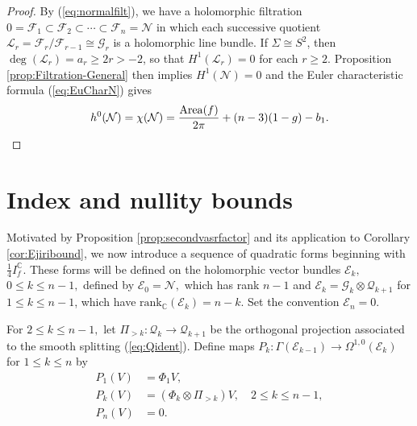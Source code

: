 \documentclass[11pt]{article}
\theoremstyle{definition}
\newcommand{\C}{\mathbb{C}}
\numberwithin{equation}{section}
\begin{document}
\begin{proof}
	By (\ref{eq:normalfilt}), we have a holomorphic filtration $0 = \mathcal{F}_1 \subset \mathcal{F}_2 \subset \cdots \subset \mathcal{F}_n = \mathcal{N}$ in which each successive quotient $\mathcal{L}_r = \mathcal{F}_r/\mathcal{F}_{r-1} \cong \mathcal{G}_r$ is a holomorphic line bundle. If $\Sigma \cong S^2$, then $\deg(\mathcal{L}_r) = a_r \geq 2r > -2$, so that $H^1(\mathcal{L}_r) = 0$ for each $r \geq 2$. Proposition \ref{prop:Filtration-General} then implies $H^1(\mathcal{N}) = 0$ and the Euler characteristic formula (\ref{eq:EuCharN}) gives
	\begin{equation*}
		h^0(\mathcal{N}) = \chi(\mathcal{N}) = \frac{\operatorname{Area}(f)}{2\pi} + (n-3)(1-g) - b_1. \qedhere
	\end{equation*}
\end{proof}

\section{Index and nullity bounds}\label{sect:bounds}

\indent \indent Motivated by Proposition \ref{prop:secondvasrfactor} and its application to Corollary \ref{cor:Ejiribound}, we now introduce a sequence of quadratic forms beginning with $\tfrac{1}{4} I^{\C}_f.$  These forms will be defined on the holomorphic vector bundles $\mathcal{E}_k,$ $0 \leq k \leq n-1,$ defined by $\mathcal{E}_0 = \mathcal{N},$ which has rank $n-1$ and $\mathcal{E}_k = \mathcal{G}_k \otimes \mathcal{Q}_{k+1}$ for $1 \leq k \leq n-1$, which have $\mathrm{rank}_\C(\mathcal{E}_k) = n - k$. Set the convention $\mathcal{E}_n = 0.$

For $2 \leq k \leq n-1,$ let $\Pi_{>k}: \mathcal{Q}_{k} \to \mathcal{Q}_{k+1}$ be the orthogonal projection associated to the smooth splitting (\ref{eq:Qident}). Define maps $P_k : \Gamma(\mathcal{E}_{k-1}) \to \Omega^{1,0}(\mathcal{E}_{k})$ for $1 \leq k \leq n$ by
\begin{equation*}
	\begin{aligned}
		P_1(V) & = \Phi_1 V,                                              \\
		P_k(V) & = (\Phi_{k} \otimes \Pi_{>k})V, \quad 2 \leq k \leq n-1, \\
		P_n(V) & = 0.                                                     
	\end{aligned}
\end{equation*}
\end{document}
